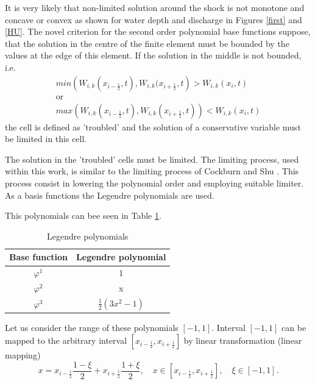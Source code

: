 It is very likely that non-limited solution around the shock is not monotone and concave or convex as shown for water depth and discharge in Figures \ref{first} and \ref{HU}. The novel criterion for the second order polynomial base functions suppose, that the solution in the centre of the finite element must be bounded by the values at the edge of this element. If the solution in the middle is not bounded, i.e.
\begin{equation}\label{crit}
\begin{array}{c}
 min\left(W_{i,k}(x_{i-\frac12},t),W_{i,k}(x_{i+\frac12},t\right)>W_{i,k}(x_i,t)\\ 
\text{or}\\
 max\left(W_{i,k}(x_{i-\frac12},t),W_{i,k}(x_{i+\frac12},t)\right)< W_{i,k}(x_i,t)
 \end{array}
\end{equation}
the cell is defined as 'troubled' and the solution of a conservative variable must be limited in this cell.

The solution in the 'troubled' cells must be limited. The limiting process, used within this work, is similar to the limiting process of Cockburn and Shu \cite{Cockburn1989b}. This process consist in lowering the polynomial order and employing suitable limiter. As a basis functions the Legendre polynomials are used.

 This polynomials can bee seen in Table \ref{table:legendre}.
\begin{table}
\caption{Legendre polynomials}
\centering
\begin{tabular}{|c|c |}
\hline
Base function & Legendre polynomial\\
\hline
\hline
$\varphi^1$ & 1\\
$\varphi^2$ & x\\
$\varphi^3$ & $\frac12\left(3x^2-1\right)$\\
\hline
\end{tabular}
\label{table:legendre}%
\end{table}
Let us consider the range of these polynomials $[-1,1]$. Interval $[-1,1]$ can be mapped to the arbitrary interval $[x_{i-\frac12},x_{i+\frac12}]$ by linear transformation (linear mapping)
\begin{equation}\label{mapping}
x=x_{i-\frac12}\frac{1-\xi}{2}+x_{i+\frac12}\frac{1+\xi}{2}, \quad x\in[x_{i-\frac12},x_{i+\frac12}],
\quad \xi\in[-1,1].
\end{equation}


